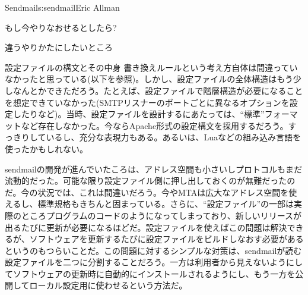 \begin{aosachapter}{Sendmail}{s:sendmail}{Eric Allman}
\begin{aosasect1}{もし今やりなおせるとしたら?}
\begin{aosasect2}{違うやりかたにしたいところ}
\begin{aosasect3}{設定ファイルの構文とその中身}
書き換えルールという考え方自体は間違っていなかったと思っている(以下を参照)。しかし、設定ファイルの全体構造はもう少しなんとかできただろう。たとえば、設定ファイルで階層構造が必要になることを想定できていなかった(SMTPリスナーのポートごとに異なるオプションを設定したりなど)。当時、設定ファイルを設計するにあたっては、``標準''フォーマットなど存在しなかった。今ならApache形式の設定構文を採用するだろう。すっきりしているし、充分な表現力もある。あるいは、Luaなどの組み込み言語を使ったかもしれない。

sendmailの開発が進んでいたころは、アドレス空間も小さいしプロトコルもまだ流動的だった。可能な限り設定ファイル側に押し出しておくのが無難だったのだ。今の状況では、これは間違いだろう。今やMTAは広大なアドレス空間を使えるし、標準規格もきちんと固まっている。さらに、``設定ファイル''の一部は実際のところプログラムのコードのようになってしまっており、新しいリリースが出るたびに更新が必要になるほどだ。設定ファイルを使えばこの問題は解決できるが、ソフトウェアを更新するたびに設定ファイルをビルドしなおす必要があるというのもつらいことだ。この問題に対するシンプルな対策は、sendmailが読む設定ファイルを二つに分割することだろう。一方は利用者から見えないようにしてソフトウェアの更新時に自動的にインストールされるようにし、もう一方を公開してローカル設定用に使わせるという方法だ。


\end{aosasect3}
\end{aosasect2}
\end{aosasect1}
\end{aosachapter}
